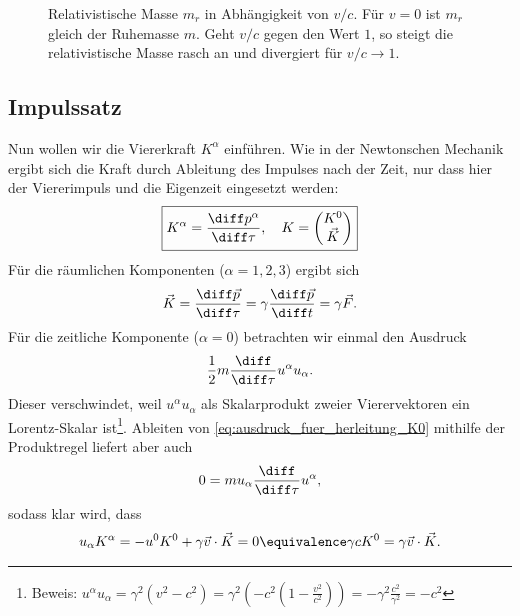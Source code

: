\begin{figure}[htb]
    \centering
    \tfigZunahmeImpulsmasse
    \caption{Relativistische Masse $m_r$ in Abhängigkeit von $v/c$. Für $v=0$ ist $m_r$ gleich der Ruhemasse $m$. Geht $v/c$ gegen den Wert $1$, so steigt die relativistische Masse rasch an und divergiert für $v/c\rightarrow 1$.}
    \label{fig:zunahme_impulsmasse}
\end{figure}



\subsection{Impulssatz}

Nun wollen wir die Viererkraft $K^\alpha$ einführen. Wie in der Newtonschen Mechanik ergibt sich die Kraft durch Ableitung des Impulses nach der Zeit, nur dass hier der Viererimpuls und die Eigenzeit eingesetzt werden:
\begin{align}
    \label{eq:impulssatz}
    \boxed{K^\alpha = \frac{\diff p^\alpha}{\diff\tau},  \quad K=\begin{pmatrix} K^0\\ \vec K \end{pmatrix}}
\end{align}
Für die räumlichen Komponenten ($\alpha=1,2,3$) ergibt sich
\begin{align*}
    \vec K = \frac{\diff\vec p}{\diff\tau} = \gamma \frac{\diff\vec p}{\diff t} = \gamma\vec F.
\end{align*}
Für die zeitliche Komponente ($\alpha=0$) betrachten wir einmal den Ausdruck
\begin{align}
    \label{eq:ausdruck_fuer_herleitung_K0}
    \frac{1}{2}m\frac{\diff}{\diff\tau}u^\alpha u_\alpha.
\end{align}
Dieser verschwindet, weil $u^\alpha u_\alpha$ als Skalarprodukt zweier Vierervektoren ein Lorentz-Skalar ist\footnote{Beweis: $u^\alpha u_\alpha=\gamma^2(v^2-c^2)=\gamma^2\left(-c^2\left(1-\frac{v^2}{c^2}\right)\right)=-\gamma^2 \frac{c^2}{\gamma^2}=-c^2$}.
Ableiten von \eqref{eq:ausdruck_fuer_herleitung_K0} mithilfe der Produktregel liefert aber auch
\begin{align*}
    0 = m u_\alpha\frac{\diff}{\diff\tau}u^\alpha,
\end{align*}
sodass klar wird, dass
\begin{align*}
    u_\alpha K^\alpha = -u^0 K^0 + \gamma\vec v\cdot \vec K = 0 \equivalence \gamma c K^0=\gamma\vec v\cdot \vec K.
\end{align*}
